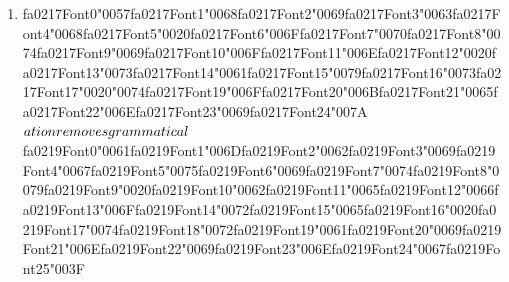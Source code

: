 \documentclass[12pt]{article}
\begin{document}
\begin{enumerate}[label=Q\arabic*.]
 \item {\csname fa0217Font0\endcsname\char"0057}{\csname fa0217Font1\endcsname\char"0068}{\csname fa0217Font2\endcsname\char"0069}{\csname fa0217Font3\endcsname\char"0063}{\csname fa0217Font4\endcsname\char"0068}{\csname fa0217Font5\endcsname\char"0020}{\csname fa0217Font6\endcsname\char"006F}{\csname fa0217Font7\endcsname\char"0070}{\csname fa0217Font8\endcsname\char"0074}{\csname fa0217Font9\endcsname\char"0069}{\csname fa0217Font10\endcsname\char"006F}{\csname fa0217Font11\endcsname\char"006E}{\csname fa0217Font12\endcsname\char"0020}{\csname fa0217Font13\endcsname\char"0073}{\csname fa0217Font14\endcsname\char"0061}{\csname fa0217Font15\endcsname\char"0079}{\csname fa0217Font16\endcsname\char"0073}{\csname fa0217Font17\endcsname\char"0020}{\char"0074}{\csname fa0217Font19\endcsname\char"006F}{\csname fa0217Font20\endcsname\char"006B}{\csname fa0217Font21\endcsname\char"0065}{\csname fa0217Font22\endcsname\char"006E}{\csname fa0217Font23\endcsname\char"0069}{\csname fa0217Font24\endcsname\char"007A}\({\csname fa0218Font0\endcsname\char"0061}{\csname fa0218Font1\endcsname\char"0074}{\csname fa0218Font2\endcsname\char"0069}{\csname fa0218Font3\endcsname\char"006F}{\csname fa0218Font4\endcsname\char"006E}{\csname fa0218Font5\endcsname\char"0020}{\csname fa0218Font6\endcsname\char"0072}{\csname fa0218Font7\endcsname\char"0065}{\csname fa0218Font8\endcsname\char"006D}{\csname fa0218Font9\endcsname\char"006F}{\csname fa0218Font10\endcsname\char"0076}{\csname fa0218Font11\endcsname\char"0065}{\csname fa0218Font12\endcsname\char"0073}{\char"0020}{\csname fa0218Font14\endcsname\char"0067}{\csname fa0218Font15\endcsname\char"0072}{\csname fa0218Font16\endcsname\char"0061}{\csname fa0218Font17\endcsname\char"006D}{\csname fa0218Font18\endcsname\char"006D}{\csname fa0218Font19\endcsname\char"0061}{\csname fa0218Font20\endcsname\char"0074}{\csname fa0218Font21\endcsname\char"0069}{\csname fa0218Font22\endcsname\char"0063}{\csname fa0218Font23\endcsname\char"0061}{\csname fa0218Font24\endcsname\char"006C}{\csname fa0218Font25\endcsname\char"0020}\){\csname fa0219Font0\endcsname\char"0061}{\csname fa0219Font1\endcsname\char"006D}{\csname fa0219Font2\endcsname\char"0062}{\csname fa0219Font3\endcsname\char"0069}{\csname fa0219Font4\endcsname\char"0067}{\csname fa0219Font5\endcsname\char"0075}{\csname fa0219Font6\endcsname\char"0069}{\csname fa0219Font7\endcsname\char"0074}{\csname fa0219Font8\endcsname\char"0079}{\csname fa0219Font9\endcsname\char"0020}{\csname fa0219Font10\endcsname\char"0062}{\csname fa0219Font11\endcsname\char"0065}{\csname fa0219Font12\endcsname\char"0066}{\csname fa0219Font13\endcsname\char"006F}{\csname fa0219Font14\endcsname\char"0072}{\csname fa0219Font15\endcsname\char"0065}{\csname fa0219Font16\endcsname\char"0020}{\csname fa0219Font17\endcsname\char"0074}{\csname fa0219Font18\endcsname\char"0072}{\csname fa0219Font19\endcsname\char"0061}{\csname fa0219Font20\endcsname\char"0069}{\csname fa0219Font21\endcsname\char"006E}{\csname fa0219Font22\endcsname\char"0069}{\csname fa0219Font23\endcsname\char"006E}{\csname fa0219Font24\endcsname\char"0067}{\csname fa0219Font25\endcsname\char"003F}

\end{enumerate}
\end{document}
